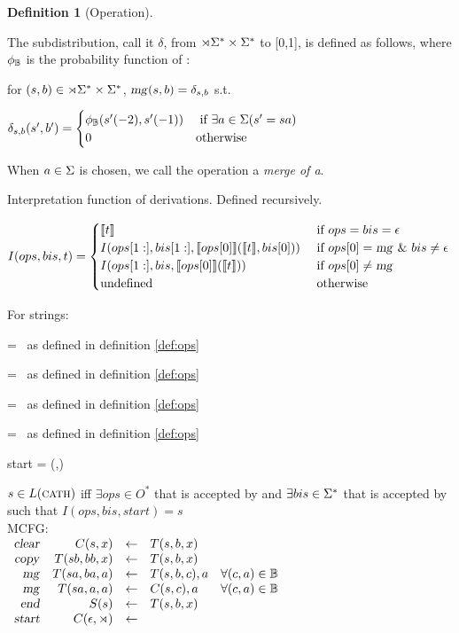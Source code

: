 \documentclass[12pt]{article}
\theoremstyle{definition}
\newtheorem{definition}{Definition}[section]
\begin{document}
\begin{definition}[Operation]
\begin{description}
     The subdistribution, call it $\delta$, from $\rtimes\Sigma^*\times\Sigma^*$ to [0,1], is defined as follows, where $\phi_{\mathbb{B}}$ is the probability function of \BIGR:

for $(s,b)\in\rtimes\Sigma^*\times\Sigma^*$, $\text{\textsl{mg}}(s,b) = \delta_{s,b}$ s.t.
     
$  \delta_{s,b}(s',b') =
\begin{cases}
  \phi_{\mathbb{B}}(s'(-2),s'(-1)) & \text{ if } \exists a\in\Sigma (s' = sa)\\
  0 & \text{otherwise}
\end{cases}
$

When $a\in\Sigma$ is chosen, we call the operation a \textit{merge of a}.


  \end{description}

\end{definition}

Interpretation function of derivations. Defined recursively.

$I(ops,bis,t) = 
\begin{cases}
  \llbracket t\rrbracket & \text{ if } ops=bis=\epsilon\\
  I(ops[1:],bis[1:],\llbracket ops[0]\rrbracket(\llbracket t\rrbracket,bis[0])) & \text{ if } ops[0]=\text{\textsl{mg}}~ \&~ bis\neq\epsilon\\
  I(ops[1:],bis,\llbracket ops[0]\rrbracket(\llbracket t\rrbracket)) & \text{ if } ops[0]\neq\text{\textsl{mg}}\\
  \text{undefined} & \text{ otherwise}
\end{cases}
$

For strings:

\llb\mg\rrb = \mg~as defined in definition \ref{def:ops}

\llb\cp\rrb = \cp~as defined in definition \ref{def:ops}

\llb\cl\rrb = \cl~as defined in definition \ref{def:ops}

\llb\ed\rrb = \ed~as defined in definition \ref{def:ops}

\llb start \rrb = (\LBOUND,\emp)


$s\in L(\text{\textsc{cath}})$ iff $\exists ops\in O^*$ that is accepted by \OPS
and $\exists bis\in \Sigma^*$ that is accepted by \BIGR 
such that
$I(ops,bis,start) = s$\\

MCFG:\\

$  \begin{array}{r  r c l l}
    \cl & C(s,x) &\der& T(s,b,x)\\
    \cp & T(sb,bb,x) &\der& T(s,b,x)\\
    \mg & T(sa,ba,a) &\der& T(s,b,c), a & \forall (c,a)\in\BIGR\\
    \mg & T(sa,a,a) &\der& C(s,c), a & \forall (c,a)\in\BIGR\\
    \ed & S(s) &\der& T(s,b,x)\\
    \text{\textsl{start}} & C(\emp,\LBOUND) &\der&\\

   \end{array}$\\\\
\end{document}
